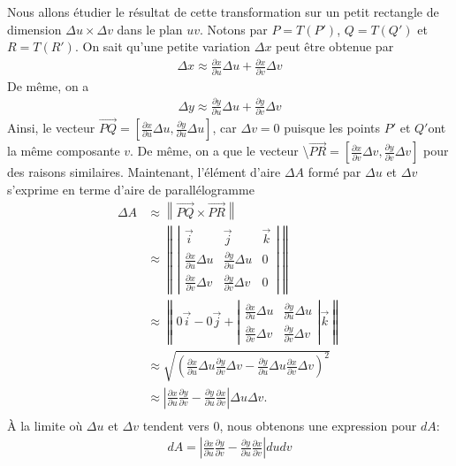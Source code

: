\documentclass[]{book}
\theoremstyle{definition}
\theoremstyle{definition}
\theoremstyle{definition}
\theoremstyle{remark}
\begin{document}
Nous allons étudier le résultat de cette transformation sur un petit
rectangle de dimension \(\Delta u \times \Delta v\) dans le plan \(uv\).
Notons par \(P=T(P')\), \(Q=T(Q')\) et \(R=T(R')\). On sait qu'une
petite variation \(\Delta x\) peut être obtenue par \begin{align*}
\Delta x\approx \frac{\partial x}{\partial u}\Delta u+\frac{\partial x}{\partial v}\Delta v
\end{align*} De même, on a \begin{align*}
\Delta y\approx \frac{\partial y}{\partial u}\Delta u+\frac{\partial y}{\partial v}\Delta v 
\end{align*} Ainsi, le vecteur
\(\overrightarrow{PQ}=\left[\frac{\partial x}{\partial u}\Delta u,\frac{\partial y}{\partial u}\Delta u\right]\),
car \(\Delta v=0\) puisque les points \(P'\) et \(Q'\)ont la même
composante \(v\). De même, on a que le vecteur
\textbackslash{}\(\overrightarrow{PR}=\left[\frac{\partial x}{\partial v}\Delta v,\frac{\partial y}{\partial v}\Delta v\right]\)
pour des raisons similaires. Maintenant, l'élément d'aire \(\Delta A\)
formé par \(\Delta u\) et \(\Delta v\) s'exprime en terme d'aire de
parallélogramme \begin{align*}
\Delta A&\approx \left\| \overrightarrow{PQ}\times    \overrightarrow{PR}\right\| \\
&\approx \left\| \left| 
\begin{array}{ccc}
\vec i &\vec j& \vec k\\
\frac{\partial x}{\partial u}\Delta u & \frac{\partial y}{\partial u}\Delta u &0 \\
\frac{\partial x}{\partial v}\Delta v & \frac{\partial y}{\partial v}\Delta v &0
\end{array}  \right|   \right\|\\
&\approx 
\left\| 0\vec i -0\vec j+ \left| 
\begin{array}{cc}
\frac{\partial x}{\partial u}\Delta u & \frac{\partial y}{\partial u}\Delta u \\
\frac{\partial x}{\partial v}\Delta v & \frac{\partial y}{\partial v}\Delta v 
\end{array}  \right| \vec k  \right\|\\
&\approx 
\sqrt{\left(\frac{\partial x}{\partial u}\Delta u \frac{\partial y}{\partial v}\Delta v- \frac{\partial y}{\partial u}\Delta u \frac{\partial x}{\partial v}\Delta v\right)^2}\\
&\approx 
\left|\frac{\partial x}{\partial u}\frac{\partial y}{\partial v}- \frac{\partial y}{\partial u} \frac{\partial x}{\partial v}\right|\Delta u\Delta v.\\
\end{align*} À la limite où \(\Delta u\) et \(\Delta v\) tendent vers
\(0\), nous obtenons une expression pour \(dA\): \begin{align*}
dA=\left|\frac{\partial x}{\partial u}\frac{\partial y}{\partial v}- \frac{\partial y}{\partial u} \frac{\partial x}{\partial v}\right|dudv
\end{align*}
\end{document}
